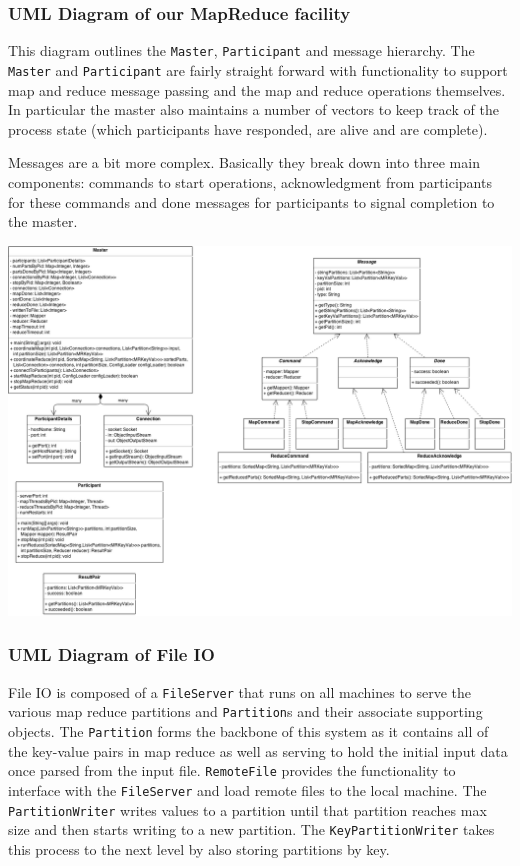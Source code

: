 \documentclass[12pt]{article}
\newcommand{\ttt}{\texttt}
\begin{document}
\subsubsection{UML Diagram of our MapReduce facility}
This diagram outlines the \ttt{Master}, \ttt{Participant} and message hierarchy. The \ttt{Master} and \ttt{Participant} are fairly straight forward with functionality to support map and reduce message passing and the map and reduce operations themselves. In particular the master also maintains a number of vectors to keep track of the process state (which participants have responded, are alive and are complete).

Messages are a bit more complex. Basically they break down into three main components: commands to start operations, acknowledgment from participants for these commands and done messages for participants to signal completion to the master.

\includegraphics[scale=.35]{MapReduce_UML.png}

\subsubsection{UML Diagram of File IO}
File IO is composed of a \ttt{FileServer} that runs on all machines to serve the various map reduce partitions and \ttt{Partition}s and their associate supporting objects. The \ttt{Partition} forms the backbone of this system as it contains all of the key-value pairs in map reduce as well as serving to hold the initial input data once parsed from the input file. \ttt{RemoteFile} provides the functionality to interface with the \ttt{FileServer} and load remote files to the local machine. The \ttt{PartitionWriter} writes values to a partition until that partition reaches max size and then starts writing to a new partition. The \ttt{KeyPartitionWriter} takes this process to the next level by also storing partitions by key. 
\end{document}
